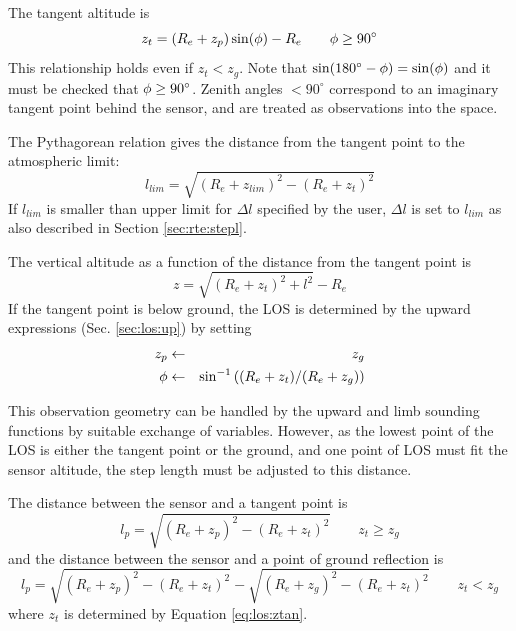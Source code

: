   \label{sec:los:limb}
  
  The tangent altitude is
  \begin{equation}
    z_t = (R_e+z_p)\sin(\phi) - R_e \qquad  \phi\geq90^\circ
   \label{eq:los:ztan}
  \end{equation}
  This relationship holds even if $z_t<z_g$. Note that
  $\sin(180^\circ-\phi)=\sin(\phi)$ and it must be checked that
  $\phi\geq90^\circ$. Zenith angles $<90^\circ$ correspond to an
  imaginary tangent point behind the sensor, and are treated as
  observations into the space.
  
  The Pythagorean relation gives the distance from the tangent point
  to the atmospheric limit:
  \begin{equation}
      l_{lim} = \sqrt{ (R_e+z_{lim})^2 - (R_e+z_t)^2}
  \end{equation}
  If $l_{lim}$ is smaller than upper limit for $\Delta l$ specified by
  the user, $\Delta l$ is set to $l_{lim}$ as also described in Section
  \ref{sec:rte:stepl}.

  The vertical altitude as a function of the distance from the
  tangent point is
  \begin{equation}
    z = \sqrt{ (R_e+z_t)^2 + l^2} - R_e
  \end{equation}
  If the tangent point is below ground, the LOS is determined by the
  upward expressions (Sec. \ref{sec:los:up}) by setting
  \begin{eqnarray}
     z_p  & \gets & z_g          \nonumber  \\
     \phi & \gets & \sin^{-1}\left((R_e+z_t)/(R_e+z_g) \right) \nonumber 
  \end{eqnarray}


  \label{sec:los:down}
  
  This observation geometry can be handled by the upward and limb
  sounding functions by suitable exchange of variables. However, as
  the lowest point of the LOS is either the tangent point or the
  ground, and one point of LOS must fit the sensor altitude, the step
  length must be adjusted to this distance.

  The distance between the sensor and a tangent point is
  \begin{equation}
    l_p = \sqrt{ (R_e+z_p)^2 - (R_e+z_t)^2 } \qquad  z_t \geq z_g
  \end{equation}
  and the distance between the sensor and a point of ground
  reflection is
  \begin{equation}
    l_p = \sqrt{ (R_e+z_p)^2 - (R_e+z_t)^2 } - \sqrt{ (R_e+z_g)^2-(R_e+z_t)^2}
            \qquad z_t < z_g
  \end{equation}
  where $z_t$ is determined by Equation \ref{eq:los:ztan}.

